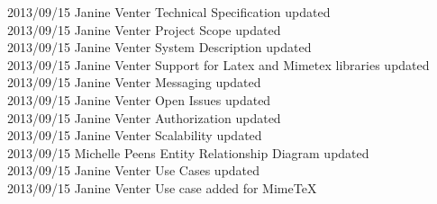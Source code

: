 \documentclass[29pt,a4paper]{moderncv}
\begin{document}
\begin{tabbing}
2013/09/15  \>  Janine Venter \> Technical Specification updated\\
2013/09/15  \> Janine Venter \> Project Scope updated\\
2013/09/15  \>  Janine Venter \> System Description updated\\
2013/09/15 \> Janine Venter \> Support for Latex and Mimetex libraries updated\\
2013/09/15  \> Janine Venter \> Messaging updated\\
2013/09/15  \>  Janine Venter \> Open Issues updated\\
2013/09/15  \> Janine Venter \> Authorization updated\\
2013/09/15  \> Janine Venter \> Scalability updated\\
2013/09/15  \> Michelle Peens \> Entity Relationship Diagram updated\\
2013/09/15  \> Janine Venter \> Use Cases updated\\
2013/09/15  \> Janine Venter \> Use case added for MimeTeX\\

\end{tabbing}


\newpage
\end{document}
